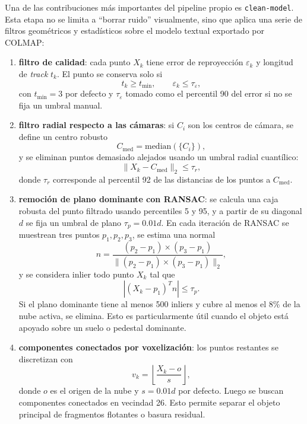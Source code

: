 \documentclass[conference]{IEEEtran}
\begin{document}
Una de las contribuciones m\'as importantes del pipeline propio es \texttt{clean-model}. Esta etapa no se limita a ``borrar ruido'' visualmente, sino que aplica una serie de filtros geom\'etricos y estad\'isticos sobre el modelo textual exportado por COLMAP:
\begin{enumerate}
  \item \textbf{filtro de calidad}: cada punto \(X_k\) tiene error de reproyecci\'on \(\varepsilon_k\) y longitud de \emph{track} \(t_k\). El punto se conserva solo si
  \begin{equation}
  t_k \ge t_{\min}, \qquad \varepsilon_k \le \tau_{\varepsilon},
  \end{equation}
  con \(t_{\min}=3\) por defecto y \(\tau_{\varepsilon}\) tomado como el percentil 90 del error si no se fija un umbral manual.

  \item \textbf{filtro radial respecto a las c\'amaras}: si \(C_i\) son los centros de c\'amara, se define un centro robusto
  \begin{equation}
  C_{\text{med}} = \mathrm{median}\left(\{C_i\}\right),
  \end{equation}
  y se eliminan puntos demasiado alejados usando un umbral radial cuant\'ilico:
  \begin{equation}
  \|X_k - C_{\text{med}}\|_2 \le \tau_r,
  \end{equation}
  donde \(\tau_r\) corresponde al percentil 92 de las distancias de los puntos a \(C_{\text{med}}\).

  \item \textbf{remoci\'on de plano dominante con RANSAC}: se calcula una caja robusta del punto filtrado usando percentiles 5 y 95, y a partir de su diagonal \(d\) se fija un umbral de plano \(\tau_p = 0.01d\). En cada iteraci\'on de RANSAC se muestrean tres puntos \(p_1,p_2,p_3\), se estima una normal
  \begin{equation}
  n = \frac{(p_2-p_1)\times(p_3-p_1)}{\|(p_2-p_1)\times(p_3-p_1)\|_2},
  \end{equation}
  y se considera inlier todo punto \(X_k\) tal que
  \begin{equation}
  |(X_k-p_1)^T n| \le \tau_p.
  \end{equation}
  Si el plano dominante tiene al menos 500 inliers y cubre al menos el 8\% de la nube activa, se elimina. Esto es particularmente \'util cuando el objeto est\'a apoyado sobre un suelo o pedestal dominante.

  \item \textbf{componentes conectados por voxelizaci\'on}: los puntos restantes se discretizan con
  \begin{equation}
  v_k = \left\lfloor \frac{X_k - o}{s} \right\rfloor,
  \end{equation}
  donde \(o\) es el origen de la nube y \(s=0.01d\) por defecto. Luego se buscan componentes conectados en vecindad 26. Esto permite separar el objeto principal de fragmentos flotantes o basura residual.


\end{enumerate}
\end{document}
